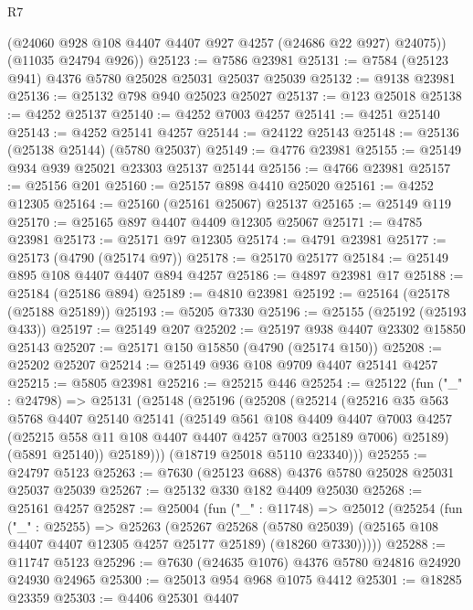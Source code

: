\begin{lexlean}{R7}
\begin{coremodule}
        (@24060 @928 @108 @4407 @4407 @927 @4257 (@24686 @22 @927) @24075))
      (@11035 @24794 @926))
@25123 := @7586 @23981
@25131 := @7584 (@25123 @941) @4376 @5780 @25028 @25031 @25037 @25039
@25132 := @9138 @23981
@25136 := @25132 @798 @940 @25023 @25027
@25137 := @123 @25018
@25138 := @4252 @25137
@25140 := @4252 @7003 @4257
@25141 := @4251 @25140
@25143 := @4252 @25141 @4257
@25144 := @24122 @25143
@25148 := @25136 (@25138 @25144) (@5780 @25037)
@25149 := @4776 @23981
@25155 := @25149 @934 @939 @25021 @23303 @25137 @25144
@25156 := @4766 @23981
@25157 := @25156 @201
@25160 := @25157 @898 @4410 @25020
@25161 := @4252 @12305
@25164 := @25160 (@25161 @25067) @25137
@25165 := @25149 @119
@25170 := @25165 @897 @4407 @4409 @12305 @25067
@25171 := @4785 @23981
@25173 := @25171 @97 @12305
@25174 := @4791 @23981
@25177 := @25173 (@4790 (@25174 @97))
@25178 := @25170 @25177
@25184 := @25149 @895 @108 @4407 @4407 @894 @4257
@25186 := @4897 @23981 @17
@25188 := @25184 (@25186 @894)
@25189 := @4810 @23981
@25192 := @25164 (@25178 (@25188 @25189))
@25193 := @5205 @7330
@25196 := @25155 (@25192 (@25193 @433))
@25197 := @25149 @207
@25202 := @25197 @938 @4407 @23302 @15850 @25143
@25207 := @25171 @150 @15850 (@4790 (@25174 @150))
@25208 := @25202 @25207
@25214 := @25149 @936 @108 @9709 @4407 @25141 @4257
@25215 := @5805 @23981
@25216 := @25215 @446
@25254 := @25122
    (fun ("_" : @24798) =>
    @25131
      (@25148
        (@25196
          (@25208
            (@25214
              (@25216
                @35
                @563
                @5768
                @4407
                @25140
                @25141
                (@25149
                  @561
                  @108
                  @4409
                  @4407
                  @7003
                  @4257
                  (@25215 @558 @11 @108 @4407 @4407 @4257 @7003 @25189 @7006)
                  @25189)
                (@5891 @25140))
              @25189)))
        (@18719 @25018 @5110 @23340)))
@25255 := @24797 @5123
@25263 := @7630 (@25123 @688) @4376 @5780 @25028 @25031 @25037 @25039
@25267 := @25132 @330 @182 @4409 @25030
@25268 := @25161 @4257
@25287 := @25004
    (fun ("_" : @11748) =>
    @25012
      (@25254
        (fun ("_" : @25255) =>
        @25263
          (@25267
            @25268
            (@5780 @25039)
            (@25165 @108 @4407 @4407 @12305 @4257 @25177 @25189)
            (@18260 @7330)))))
@25288 := @11747 @5123
@25296 := @7630 (@24635 @1076) @4376 @5780 @24816 @24920 @24930 @24965
@25300 := @25013 @954 @968 @1075 @4412
@25301 := @18285 @23359
@25303 := @4406 @25301 @4407

\end{coremodule}
\end{lexlean}
